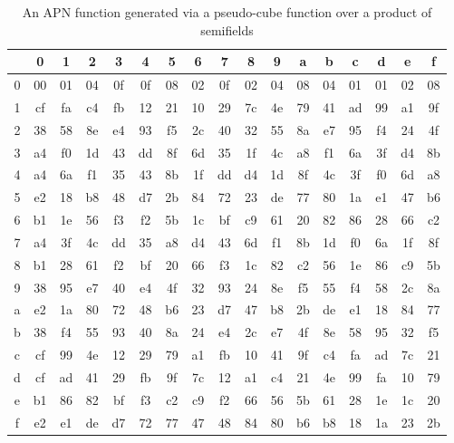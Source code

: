 \documentclass{article}\usepackage{amsthm}
\begin{document}
\begin{table}[htb]\center
\begin{tabular}{|c||c|c|c|c|c|c|c|c|c|c|c|c|c|c|c|c|}
  \hline
  & 0 & 1 &2 &3 &4 &5&6&7&8&9&a&b&c&d&e&f \\
  \hline
  \hline
  0&00 & 01 & 04 & 0f & 0f & 08 & 02 & 0f & 02 & 04 & 08 & 04 & 01 & 01 & 02 & 08\\ \hline 
  1&cf & fa & c4 & fb & 12 & 21 & 10 & 29 & 7c & 4e & 79 & 41 & ad & 99 & a1 & 9f\\ \hline 
  2&38 & 58 & 8e & e4 & 93 & f5 & 2c & 40 & 32 & 55 & 8a & e7 & 95 & f4 & 24 & 4f\\ \hline 
  3&a4 & f0 & 1d & 43 & dd & 8f & 6d & 35 & 1f & 4c & a8 & f1 & 6a & 3f & d4 & 8b\\ \hline 
  4&a4 & 6a & f1 & 35 & 43 & 8b & 1f & dd & d4 & 1d & 8f & 4c & 3f & f0 & 6d & a8\\ \hline 
  5&e2 & 18 & b8 & 48 & d7 & 2b & 84 & 72 & 23 & de & 77 & 80 & 1a & e1 & 47 & b6\\ \hline 
  6&b1 & 1e & 56 & f3 & f2 & 5b & 1c & bf & c9 & 61 & 20 & 82 & 86 & 28 & 66 & c2\\ \hline 
  7&a4 & 3f & 4c & dd & 35 & a8 & d4 & 43 & 6d & f1 & 8b & 1d & f0 & 6a & 1f & 8f\\ \hline 
  8&b1 & 28 & 61 & f2 & bf & 20 & 66 & f3 & 1c & 82 & c2 & 56 & 1e & 86 & c9 & 5b\\ \hline 
  9&38 & 95 & e7 & 40 & e4 & 4f & 32 & 93 & 24 & 8e & f5 & 55 & f4 & 58 & 2c & 8a\\ \hline 
  a&e2 & 1a & 80 & 72 & 48 & b6 & 23 & d7 & 47 & b8 & 2b & de & e1 & 18 & 84 & 77\\ \hline 
  b&38 & f4 & 55 & 93 & 40 & 8a & 24 & e4 & 2c & e7 & 4f & 8e & 58 & 95 & 32 & f5\\ \hline 
  c&cf & 99 & 4e & 12 & 29 & 79 & a1 & fb & 10 & 41 & 9f & c4 & fa & ad & 7c & 21\\ \hline 
  d&cf & ad & 41 & 29 & fb & 9f & 7c & 12 & a1 & c4 & 21 & 4e & 99 & fa & 10 & 79\\ \hline 
  e&b1 & 86 & 82 & bf & f3 & c2 & c9 & f2 & 66 & 56 & 5b & 61 & 28 & 1e & 1c & 20\\ \hline 
  f&e2 & e1 & de & d7 & 72 & 77 & 47 & 48 & 84 & 80 & b6 & b8 & 18 & 1a & 23 & 2b\\ \hline 


\end{tabular}
\caption{An APN function generated via a pseudo-cube function over a product of semifields}\label{tab:apncube}
\end{table}
\end{document}
